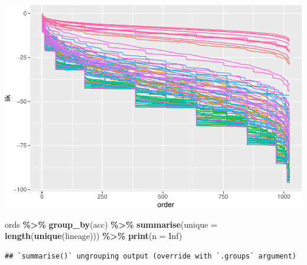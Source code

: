 \documentclass[
]{article}
\newenvironment{Shaded}{\begin{snugshade}}{\end{snugshade}}
\newcommand{\DataTypeTok}[1]{\textcolor[rgb]{0.13,0.29,0.53}{#1}}
\newcommand{\KeywordTok}[1]{\textcolor[rgb]{0.13,0.29,0.53}{\textbf{#1}}}
\newcommand{\NormalTok}[1]{#1}
\newcommand{\OperatorTok}[1]{\textcolor[rgb]{0.81,0.36,0.00}{\textbf{#1}}}
\newcommand{\OtherTok}[1]{\textcolor[rgb]{0.56,0.35,0.01}{#1}}
\newcommand{\StringTok}[1]{\textcolor[rgb]{0.31,0.60,0.02}{#1}}
\begin{document}
\includegraphics{ord-results_files/figure-latex/change_in_weight-1.pdf}

\begin{Shaded}
\begin{Highlighting}[]
\NormalTok{ords }\OperatorTok{\%\textgreater{}\%}
\StringTok{    }\KeywordTok{group\_by}\NormalTok{(acc) }\OperatorTok{\%\textgreater{}\%}
\StringTok{    }\KeywordTok{summarise}\NormalTok{(}\DataTypeTok{unique =} \KeywordTok{length}\NormalTok{(}\KeywordTok{unique}\NormalTok{(lineage))) }\OperatorTok{\%\textgreater{}\%}
\StringTok{    }\KeywordTok{print}\NormalTok{(}\DataTypeTok{n =} \OtherTok{Inf}\NormalTok{)}
\end{Highlighting}
\end{Shaded}

\begin{verbatim}
## `summarise()` ungrouping output (override with `.groups` argument)
\end{verbatim}
\end{document}
